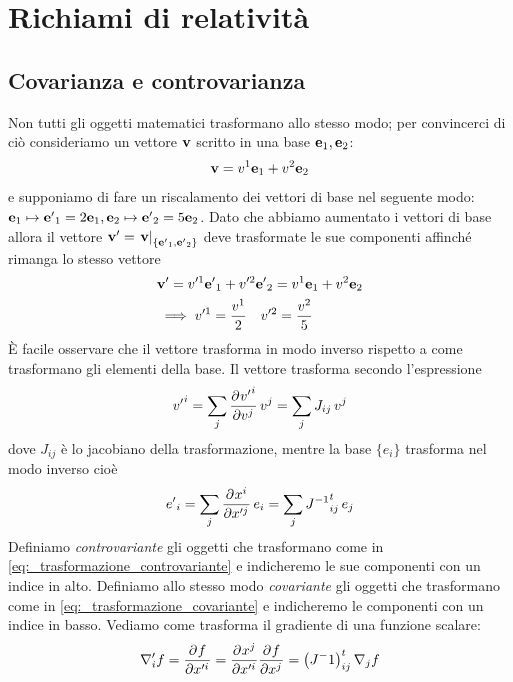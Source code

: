 \chapter{Richiami di relatività}

\section{Covarianza e controvarianza}
Non tutti gli oggetti matematici trasformano allo stesso modo; per convincerci di ciò consideriamo un vettore $ \mathbf{v} $ scritto in una base 
$ \mathbf{e}_1, \mathbf{e}_2 $:
\begin{align}
  \mathbf{v} = v^1\mathbf{e}_1 + v^2 \mathbf{e}_2
\end{align}
e supponiamo di fare un riscalamento dei vettori di base nel seguente modo: $ \mathbf{e}_1 \mapsto \mathbf{e'}_1 = 2\mathbf{e}_1, \mathbf{e}_2 \mapsto \mathbf{e'}_2 = 5\mathbf{e}_2  $. 
Dato che abbiamo aumentato i vettori di base allora il vettore $ \mathbf{v'} = \left. \mathbf{v} \right|_{\{ \mathbf{e'}_1, \mathbf{e'}_2\}} $ deve trasformate le sue 
componenti affinché rimanga lo stesso vettore
\begin{align}
  &\mathbf{v'} = v'^1 \mathbf{e'}_1 + v'^2 \mathbf{e'}_2 = v^1\mathbf{e}_1 + v^2 \mathbf{e}_2
  \\
  &\implies v'^1 = \frac{v^1}{2} \quad v'^2 = \frac{v^2}{5}
\end{align}
È facile osservare che il vettore trasforma in modo inverso rispetto a come trasformano gli elementi della base. Il vettore trasforma secondo l'espressione 
\begin{align} \label{eq:_trasformazione_controvariante}
  {v'}^i = \sum_j \frac{\partial^{} {{v'}^i}}{\partial {{v^j}}^{}} \, v^j = \sum_j J_{i j} \, v^j
\end{align}
dove $ J_{i j} $ è lo jacobiano della trasformazione, mentre la base $ \{ e_i \} $ trasforma nel modo inverso cioè
\begin{align} \label{eq:_trasformazione_covariante}
  {e'}_i = \sum_j \frac{\partial^{} {x^i}}{\partial {x'^j}^{}} \, e_i = \sum_j {J^{-1}}^t_{i j} \, e_j
\end{align}
Definiamo \textit{controvariante} gli oggetti che trasformano come in \eqref{eq:_trasformazione_controvariante} e indicheremo le sue componenti con un 
indice in alto. Definiamo allo stesso modo \textit{covariante} gli oggetti che trasformano come in \eqref{eq:_trasformazione_covariante} e indicheremo le 
componenti con un indice in basso. Vediamo come trasforma il gradiente di una funzione scalare:
\begin{align}
  \nabla'_i f = \frac{\partial^{} {f}}{\partial {x'^i}^{}} = \frac{\partial^{} {x^j}}{\partial {x'^i}^{}} \frac{\partial^{} {f}}{\partial {x^j}^{}} = \left( J^-1 \right)^t_{i j} \nabla_j f
\end{align}

